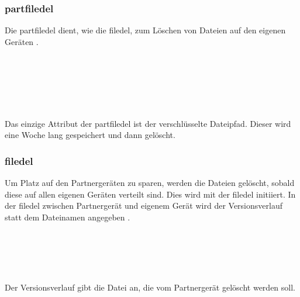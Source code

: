 \subsubsection{\gls{partfiledel}}
Die \gls{partfiledel} dient, wie die \gls{filedel}, zum Löschen von Dateien auf den eigenen Geräten .
\messagestart
	\begin{rightwordgroup}{\isprotomsgtype}
	\end{rightwordgroup} \\
	
	\begin{rightwordgroup}{\isprotomsgdata}
		 \\
		\skippedwords \\
		 \\
	\end{rightwordgroup}
\begin{description}
	Das einzige Attribut der \gls{partfiledel} ist der verschlüsselte Dateipfad. Dieser wird eine Woche lang gespeichert und dann gelöscht.
\end{description}

\subsubsection{\gls{filedel}}
Um Platz auf den Partnergeräten zu sparen, werden die Dateien gelöscht, sobald diese auf allen eigenen Geräten verteilt sind. Dies wird mit der \gls{filedel} initiiert. In der \gls{filedel} zwischen Partnergerät und eigenem Gerät wird der Versionsverlauf statt dem Dateinamen angegeben .
\messagestart
	\begin{rightwordgroup}{\isprotomsgtype}
	\end{rightwordgroup}\\
	
	\begin{rightwordgroup}{\isprotomsgdata}
		 \\
		\skippedwords \\
	\end{rightwordgroup}
\begin{description}
	Der Versionsverlauf gibt die Datei an, die vom Partnergerät gelöscht werden soll.
\end{description}